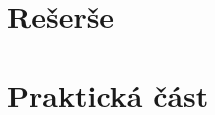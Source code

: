 \documentclass{ctuthesis}
\begin{document}
\maketitle



\part{Rešerše}

\part{Praktická část}

\printbibliography{}
\end{document}
